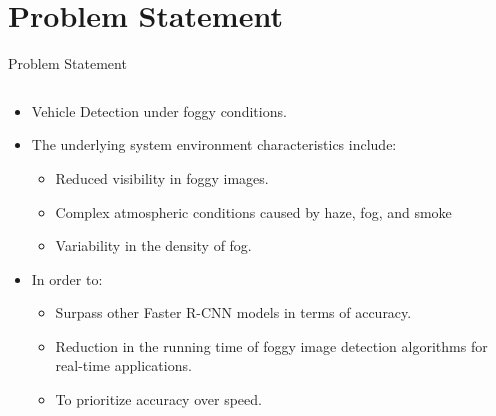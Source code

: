 \documentclass[10pt,aspectratio=169,t]{beamer}
\begin{document}
\section{Problem Statement}
\begin{frame}{Problem Statement}
\begin{columns}
\begin{column}{1\textwidth}
\begin{itemize}
 \item Vehicle Detection under foggy conditions.
 \item The underlying system environment characteristics include:
 \begin{itemize}
    \item Reduced visibility in foggy images.
    \item Complex atmospheric conditions caused by haze, fog, and smoke
    \item Variability in the density of fog.
 \end{itemize}
 \item In order to:
 \begin{itemize}
  \item Surpass other Faster R-CNN models in terms of accuracy.
  \item Reduction in the running time of foggy image detection algorithms for real-time applications.
  \item To prioritize accuracy over speed.
 \end{itemize}
\end{itemize}
\end{column}
\end{columns}
\end{frame}
\newpage


\end{document}
